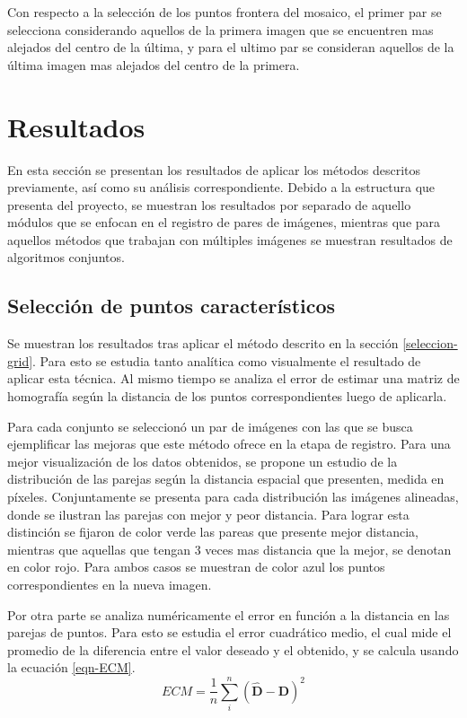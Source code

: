 Con respecto  a la selección de los puntos frontera del mosaico, el primer par se selecciona considerando aquellos de la primera imagen que se encuentren mas alejados del centro de la última, y para el ultimo par se consideran aquellos de la última imagen mas alejados del centro de la primera.

\section{Resultados}

En esta sección se presentan los resultados de aplicar los métodos descritos previamente, así como su análisis correspondiente. Debido a la estructura que presenta del proyecto, se muestran los resultados por separado de aquello módulos que se enfocan en el registro de pares de imágenes, mientras que para aquellos métodos que trabajan con múltiples imágenes se muestran resultados de algoritmos conjuntos.

\subsection*{Selección de puntos característicos}

Se muestran los resultados tras aplicar el método descrito en la 
sección \ref{seleccion-grid}. Para esto se estudia tanto analítica como visualmente el resultado de aplicar esta técnica. Al mismo tiempo se analiza el error de estimar una matriz de homografía según la distancia de los puntos correspondientes luego de aplicarla. 

Para cada conjunto se seleccionó un par de imágenes con las que se busca ejemplificar las mejoras que este método ofrece en la etapa de registro. Para una mejor visualización de los datos obtenidos, se propone un estudio de la distribución de las parejas según la distancia espacial que presenten, medida en píxeles. Conjuntamente se presenta para cada distribución las imágenes alineadas, donde se ilustran las parejas con mejor y peor distancia. Para lograr esta distinción se fijaron de color verde las pareas que presente mejor distancia, mientras que aquellas que tengan 3 veces mas distancia que la mejor, se denotan en color rojo. Para ambos casos se muestran de color azul los puntos correspondientes en la nueva imagen.

Por otra parte se analiza numéricamente el error en función a la distancia en las parejas de puntos. Para esto se estudia el error cuadrático medio, el cual mide el promedio de la diferencia entre el valor deseado y el obtenido, y se calcula usando la ecuación \ref{eqn-ECM}.
\begin{equation}\label{eqn-ECM}
	ECM = \frac{1}{n} \sum_{i}^{n} \left( \hat{\mathbf{D}} - \mathbf{D} \right)^2
\end{equation}

